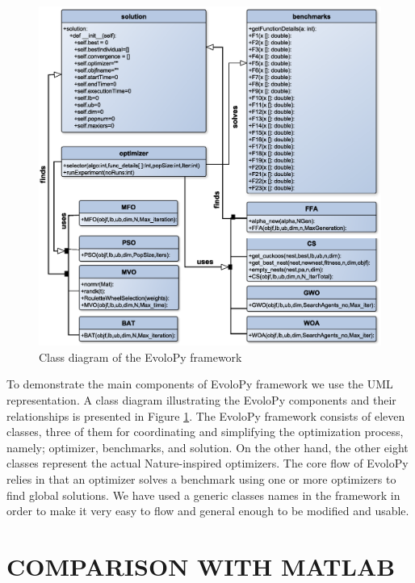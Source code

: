 \documentclass[a4paper,twoside]{article}
\begin{document}
\begin{figure}
\centerline{\includegraphics[scale=0.35]{classD.eps}}
\caption{Class diagram of the EvoloPy framework}
\label{fig:framework}
\end{figure}

To demonstrate the main components of EvoloPy framework we use the UML representation. A class diagram illustrating the EvoloPy components and their relationships is presented in Figure \ref{fig:framework}. The EvoloPy framework consists of eleven classes, three of them for coordinating and simplifying the optimization process, namely; optimizer, benchmarks, and solution. On the other hand, the other eight classes represent the actual Nature-inspired optimizers. The core flow of EvoloPy relies in that an optimizer solves a benchmark using one or more optimizers to find global solutions. We have used a generic classes names in the framework in order to make it very easy to flow and general enough to be modified and usable. 




\section{\uppercase{Comparison with Matlab}}
\end{document}
